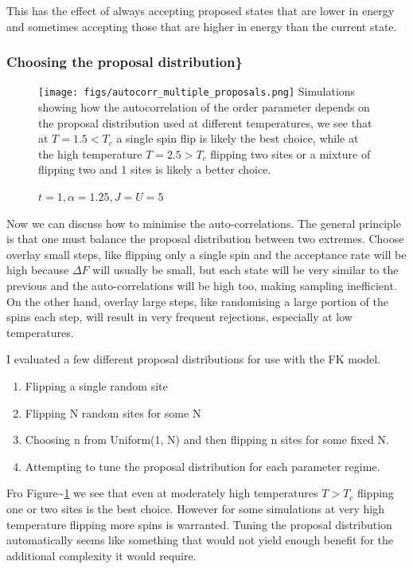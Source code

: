 This has the effect of always accepting proposed states that are lower
in energy and sometimes accepting those that are higher in energy than
the current state.

\hypertarget{choosing-the-proposal-distribution}{%
\subsubsection{Choosing the proposal
distribution\}}\label{choosing-the-proposal-distribution}}

\begin{figure}[H]
  \centering
  \texttt{[image: figs/autocorr\_multiple\_proposals.png]}
  Simulations showing how the autocorrelation of the order parameter depends on the proposal distribution used at different temperatures, we see that at $T = 1.5 < T_c$ a single spin flip is likely the best choice, while at the high temperature $T = 2.5 > T_c$ flipping two sites or a mixture of flipping two and 1 sites is likely a better choice. 
  \caption{ $t = 1, \alpha = 1.25, J = U = 5 $ \label{fig:comparison}}
\end{figure}

Now we can discuss how to minimise the auto-correlations. The general
principle is that one must balance the proposal distribution between two
extremes. Choose overlay small steps, like flipping only a single spin
and the acceptance rate will be high because \(\Delta F\) will usually
be small, but each state will be very similar to the previous and the
auto-correlations will be high too, making sampling inefficient. On the
other hand, overlay large steps, like randomising a large portion of the
spins each step, will result in very frequent rejections, especially at
low temperatures.

I evaluated a few different proposal distributions for use with the FK
model.

\begin{enumerate}
\item Flipping a single random site
\item Flipping N random sites for some N
\item Choosing n from Uniform(1, N) and then flipping n sites for some fixed N.
\item Attempting to tune the proposal distribution for each parameter regime.
\end{enumerate}

Fro Figure\textasciitilde{}\ref{fig:comparison} we see that even at
moderately high temperatures \(T > T_c\) flipping one or two sites is
the best choice. However for some simulations at very high temperature
flipping more spins is warranted. Tuning the proposal distribution
automatically seems like something that would not yield enough benefit
for the additional complexity it would require.

